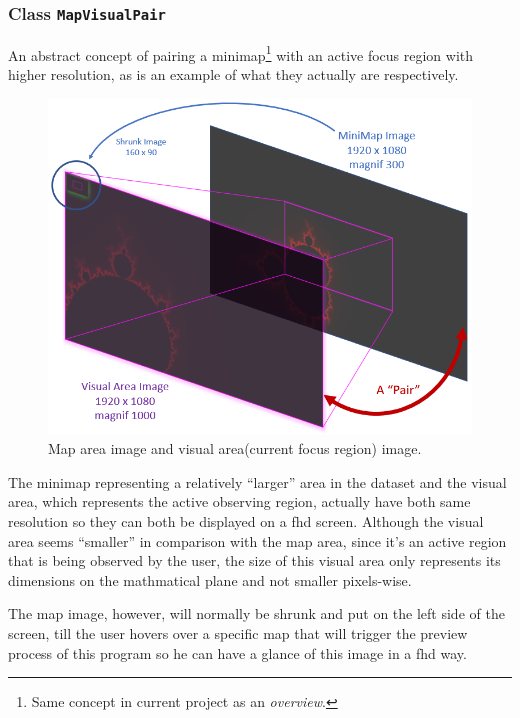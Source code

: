 \subsubsection{Class \texttt{MapVisualPair}}

An abstract concept of pairing a minimap\footnote{ Same concept in current project as an \emph{overview}. } with an active focus region with higher resolution, as  is an example of what they actually are respectively.

\begin{figure}[th]
\centering
\includegraphics[width=\textwidth,keepaspectratio]{Figures/Chapter4/mapvisualpair.png}
\decoRule
\caption[Map Visual Pair]{Map area image and visual area(current focus region) image.}
\label{fig:mapvisualpair}
\end{figure}

The minimap representing a relatively ``larger'' area in the dataset and the visual area, which represents the active observing region, actually have both same resolution so they can both be displayed on a \gls{fhd} screen. Although the visual area seems ``smaller'' in comparison with the \gls{map} area, since it's an active region that is being observed by the user, the size of this visual area only represents its dimensions on the mathmatical plane and not smaller pixels-wise.

The \gls{map} image, however, will normally be shrunk and put on the left side of the screen, till the user hovers over a specific \gls{map} that will trigger the preview process of this program so he can have a glance of this image in a \gls{fhd} way.

